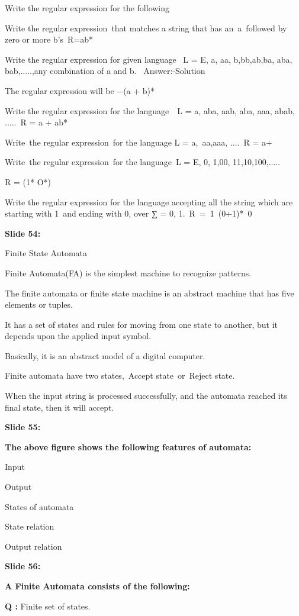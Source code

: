 \documentclass[11pt,a4paper]{article}
\begin{document}
Write the regular expression for the following

Write the regular expression that matches a string that has an a followed by zero or more b's R=ab*

Write the regular expression for given language  L = {E, a, aa, b,bb,ab,ba, aba, bab,.....},any combination of a and b.  Answer:-Solution

The regular expression will be −(a + b)*

Write the regular expression for the language  L = {a, aba, aab, aba, aaa, abab, .....} R = {a + ab}*

Write the regular expression for the language L = {a, aa,aaa, ....} R = a+

Write the regular expression for the language L = {E, 0, 1,00, 11,10,100,.....}

R = (1* O*)

Write the regular expression for the language accepting all the string which are starting with 1 and ending with 0, over ∑ = {0, 1}. R = 1 (0+1)* 0

\textbf{Slide 54:}

Finite State Automata

Finite Automata(FA) is the simplest machine to recognize patterns.

The finite automata or finite state machine is an abstract machine that has five elements or tuples.

It has a set of states and rules for moving from one state to another, but it depends upon the applied input symbol.

Basically, it is an abstract model of a digital computer.

Finite automata have two states, Accept state or Reject state.

When the input string is processed successfully, and the automata reached its final state, then it will accept.

\textbf{Slide 55:}

\textbf{The above figure shows the following features of automata:} 

Input

Output

States of automata

State relation

Output relation

\textbf{Slide 56:}

\textbf{A Finite Automata consists of the following:} 

\textbf{Q :}  Finite set of states.
\end{document}
